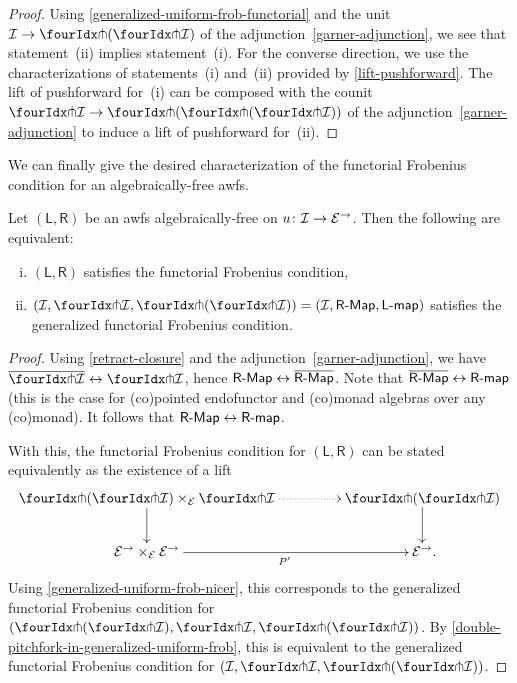 \documentclass[reqno,10pt,a4paper,oneside,draft]{amsart}
\newcommand{\LL}{\mathsf{L}}
\newcommand{\RR}{\mathsf{R}}
\begin{document}
{{\begin{proof}
Using \cref{generalized-uniform-frob-functorial} and the unit $\cal{I} \to \liftl{(\liftr{\cal{I}})}$ of the adjunction~\eqref{garner-adjunction}, we see that statement~(ii) implies statement~(i).
For the converse direction, we use the characterizations of statements~(i) and~(ii) provided by \cref{lift-pushforward}.
The lift of pushforward for~(i) can be composed with the counit $\liftr{\cal{I}} \to \liftr{(\liftl{(\liftr{\cal{I}})})}$ of the adjunction~\eqref{garner-adjunction} to induce a lift of pushforward for~(ii).
\end{proof}

We can finally give the desired characterization of the functorial Frobenius condition for an algebraically-free awfs.

\begin{theorem} \label{thm:frobenius-comparison}
Let $(\LL, \RR)$ be an awfs algebraically-free on $u \colon \mathcal{I} \to \mathcal{E}^\to$.
Then the following are equivalent:
\begin{enumerate}[(i)]
\item $(\LL, \RR)$ satisfies the functorial Frobenius condition,
\item $(\cal{I}, \liftr{\cal{I}}, \liftl{(\liftr{\cal{I}})}) = (\cal{I}, \pAlg{\RR}, \pcoalg{\LL})$ satisfies the generalized functorial Frobenius condition.
\end{enumerate}
\end{theorem}

\begin{proof}
Using \cref{retract-closure} and the adjunction~\eqref{garner-adjunction}, we have $\overline{\liftr{\cal{I}}} \leftrightarrow \liftr{\cal{I}}$, hence $\pAlg{\RR} \leftrightarrow \overline{\pAlg{\RR}}$.
Note that $\overline{\pAlg{\RR}} \leftrightarrow \palg{\RR}$ (this is the case for (co)pointed endofunctor and (co)monad algebras over any (co)monad).
It follows that $\pAlg{\RR} \leftrightarrow \palg{\RR}$.

With this, the functorial Frobenius condition for $(\LL, \RR)$ can be stated equivalently as the existence of a lift
\begin{equation} \label{frobenius-comparison:0}
\begin{gathered}
\xymatrix@C+2em{
  \liftl{(\liftr{\cal{I}})} \times_{\cal{E}} \liftr{\cal{I}}
  \ar@{.>}[r]
  \ar[d]
&
  \liftl{(\liftr{\cal{I}})}
  \ar[d]
\\
  \cal{E}^\to \times_{\cal{E}} \cal{E}^\to
  \ar[r]_{P'}
&
  \cal{E}^\to
\rlap{.}}
\end{gathered}
\end{equation}
Using \cref{generalized-uniform-frob-nicer}, this corresponds to the generalized functorial Frobenius condition for $(\liftl{(\liftr{\cal{I}})}, \liftr{\cal{I}}, \liftl{(\liftr{\cal{I}})})$.
By \cref{double-pitchfork-in-generalized-uniform-frob}, this is equivalent to the generalized functorial Frobenius condition for $(\cal{I}, \liftr{\cal{I}}, \liftl{ (  \liftr{\cal{I}} ) }   )$.
\end{proof}

}}
\end{document}
